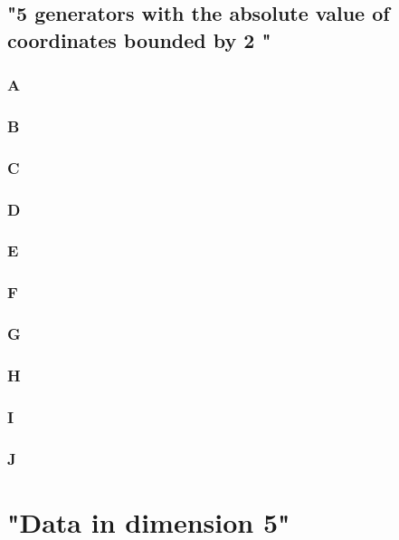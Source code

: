 \subsection{"5 generators with the absolute value of coordinates bounded by 2
"}

\subsubsection{A}

\newpage
\subsubsection{B}

\newpage
\subsubsection{C}

\newpage
\subsubsection{D}

\newpage
\subsubsection{E}

\newpage
\subsubsection{F}

\newpage
\subsubsection{G}

\newpage
\subsubsection{H}

\newpage
\subsubsection{I}

\newpage
\subsubsection{J}

\newpage
\section{"Data in dimension 5"}
